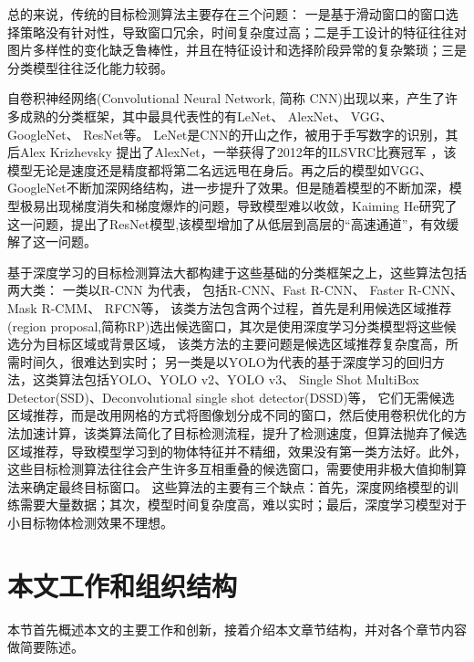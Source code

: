 总的来说，传统的目标检测算法主要存在三个问题：
一是基于滑动窗口的窗口选择策略没有针对性，导致窗口冗余，时间复杂度过高；二是手工设计的特征往往对图片多样性的变化缺乏鲁棒性，并且在特征设计和选择阶段异常的复杂繁琐；三是分类模型往往泛化能力较弱。

自卷积神经网络\cite{lecun1998gradient}(Convolutional Neural Network, 简称 CNN)出现以来，产生了许多成熟的分类框架，其中最具代表性的有LeNet\cite{lecun1998gradient}、
AlexNet\cite{krizhevsky2012imagenet}、
VGG\cite{simonyan2014very}、
GoogleNet\cite{szegedy2015going}、
ResNet\cite{he2016deep}等。
LeNet是CNN的开山之作，被用于手写数字的识别，其后Alex Krizhevsky 提出了AlexNet，一举获得了2012年的ILSVRC比赛冠军
，该模型无论是速度还是精度都将第二名远远甩在身后。再之后的模型如VGG、GoogleNet不断加深网络结构，进一步提升了效果。但是随着模型的不断加深，模型极易出现梯度消失和梯度爆炸的问题，导致模型难以收敛，Kaiming He研究了这一问题，提出了ResNet模型,该模型增加了从低层到高层的“高速通道”，有效缓解了这一问题。

基于深度学习的目标检测算法大都构建于这些基础的分类框架之上，这些算法包括两大类：
一类以R-CNN\cite{girshick2014rich}
为代表，
包括R-CNN\cite{girshick2014rich}、Fast R-CNN\cite{girshick2015fast}、
Faster R-CNN\cite{ren2015faster}、Mask R-CMM\cite{he2017mask}、
RFCN\cite{dai2016r}等，
该类方法包含两个过程，首先是利用候选区域推荐(region proposal,简称RP)选出候选窗口，其次是使用深度学习分类模型将这些候选分为目标区域或背景区域，
该类方法的主要问题是候选区域推荐复杂度高，所需时间久，很难达到实时；
另一类是以YOLO\cite{redmon2016you}为代表的基于深度学习的回归方法，这类算法包括YOLO、YOLO v2\cite{redmon2016yolo9000}、YOLO v3\cite{yolov3}、
Single Shot MultiBox Detector\cite{liu2016ssd}(SSD)、Deconvolutional single shot detector\cite{fu2017dssd}(DSSD)等，
它们无需候选区域推荐，而是改用网格的方式将图像划分成不同的窗口，然后使用卷积优化的方法加速计算，该类算法简化了目标检测流程，提升了检测速度，但算法抛弃了候选区域推荐，导致模型学习到的物体特征并不精细，效果没有第一类方法好。此外，这些目标检测算法往往会产生许多互相重叠的候选窗口，需要使用非极大值抑制算法来确定最终目标窗口。
这些算法的主要有三个缺点：首先，深度网络模型的训练需要大量数据；其次，模型时间复杂度高，难以实时；最后，深度学习模型对于小目标物体检测效果不理想。

\section{本文工作和组织结构}

本节首先概述本文的主要工作和创新，接着介绍本文章节结构，并对各个章节内容做简要陈述。

